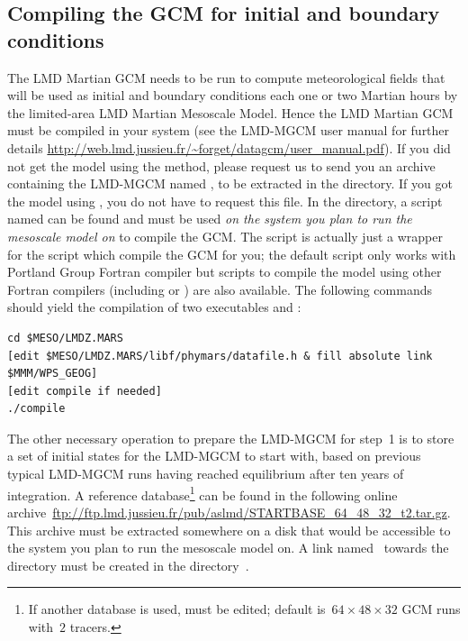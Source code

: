 \sk
\subsection{Compiling the GCM for initial and boundary conditions}

\sk
The LMD Martian GCM needs to be run to compute meteorological fields that will be used as initial and boundary conditions each one or two Martian hours by the limited-area LMD Martian Mesoscale Model. Hence the LMD Martian GCM must be compiled in your system (see the LMD-MGCM user manual for further details \url{http://web.lmd.jussieu.fr/~forget/datagcm/user_manual.pdf}). If you did not get the model using the  method, please request us to send you an archive containing the LMD-MGCM named , to be extracted in the  directory. If you got the model using , you do not have to request this file. In the  directory, a script named  can be found and must be used \emph{on the system you plan to run the mesoscale model on} to compile the GCM. The  script is actually just a wrapper for the  script which compile the GCM for you; the default  script only works with Portland Group Fortran compiler  but scripts to compile the model using other Fortran compilers (including  or ) are also available. The following commands should yield the compilation of two executables  and :

\begin{verbatim}
cd $MESO/LMDZ.MARS
[edit $MESO/LMDZ.MARS/libf/phymars/datafile.h & fill absolute link $MMM/WPS_GEOG]
[edit compile if needed]
./compile
\end{verbatim}

\sk
The other necessary operation to prepare the LMD-MGCM for step~1 is to store a set of initial states for the LMD-MGCM to start with, based on previous typical LMD-MGCM runs having reached equilibrium after ten years of integration. A reference database\footnote{If another database is used,  must be edited; default is~$64 \times 48 \times 32$ GCM runs with~$2$ tracers.} can be found in the following online archive~\url{ftp://ftp.lmd.jussieu.fr/pub/aslmd/STARTBASE_64_48_32_t2.tar.gz}. This archive must be extracted somewhere on a disk that would be accessible to the system you plan to run the mesoscale model on. A link named~ towards the  directory must be created in the directory~. 

